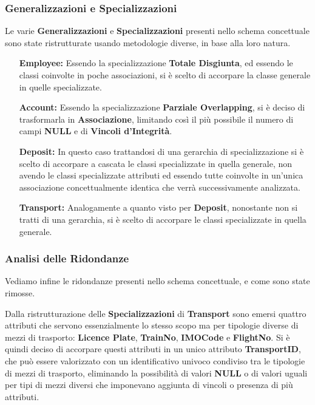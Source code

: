 \subsubsection{Generalizzazioni e Specializzazioni}

Le varie \textbf{Generalizzazioni} e \textbf{Specializzazioni} presenti nello schema concettuale sono state ristrutturate usando metodologie diverse, in base alla loro natura.

\begin{itemize}
  \item[\textbf{Employee:}] Essendo la specializzazione \textbf{Totale Disgiunta}, ed essendo le classi coinvolte in poche associazioni, si è scelto di accorpare la classe generale in quelle specializzate.
  \item[\textbf{Account:}] Essendo la specializzazione \textbf{Parziale Overlapping}, si è deciso di trasformarla in \textbf{Associazione}, limitando così il più possibile il numero di campi \textbf{NULL} e di \textbf{Vincoli d'Integrità}.
  \item[\textbf{Deposit:}] In questo caso trattandosi di una gerarchia di specializzazione si è scelto di accorpare a cascata le classi specializzate in quella generale, non avendo le classi specializzate attributi ed essendo tutte coinvolte in un'unica associazione concettualmente identica che verrà successivamente analizzata.
  \item[\textbf{Transport:}] Analogamente a quanto visto per \textbf{Deposit}, nonostante non si tratti di una gerarchia, si è scelto di accorpare le classi specializzate in quella generale. 
\end{itemize}

\subsubsection{Analisi delle Ridondanze}\label{Redundancy analysis}

Vediamo infine le ridondanze presenti nello schema concettuale, e come sono state rimosse.

Dalla ristrutturazione delle \textbf{Specializzazioni} di \textbf{Transport} sono emersi quattro attributi che servono essenzialmente lo stesso scopo ma per tipologie diverse di mezzi di trasporto: \textbf{Licence Plate}, \textbf{TrainNo}, \textbf{IMOCode} e \textbf{FlightNo}. Si è quindi deciso di accorpare questi attributi in un unico attributo \textbf{TransportID}, che può essere valorizzato con un identificativo univoco condiviso tra le tipologie di mezzi di trasporto, eliminando la possibilità di valori \textbf{NULL} o di valori uguali per tipi di mezzi diversi che imponevano aggiunta di vincoli o presenza di più attributi.

